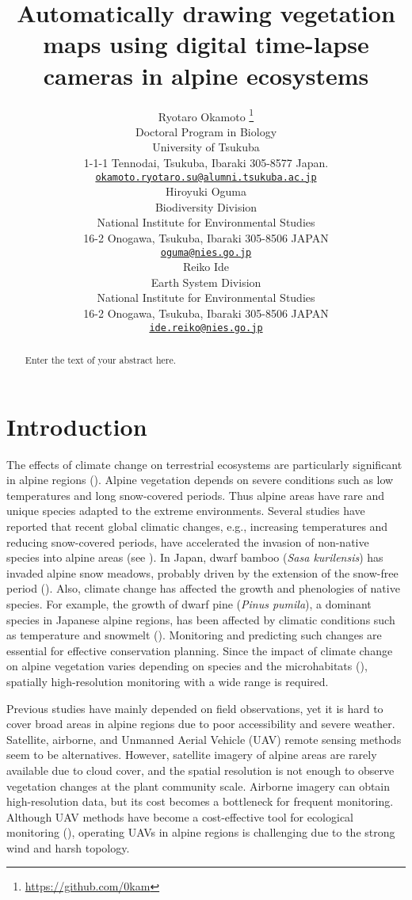 \documentclass{article}
\title{Automatically drawing vegetation maps using digital time-lapse
cameras in alpine ecosystems}
\author{
    Ryotaro Okamoto
    \thanks{\url{https://github.com/0kam}}
   \\
    Doctoral Program in Biology \\
    University of Tsukuba \\
  1-1-1 Tennodai, Tsukuba, Ibaraki 305-8577 Japan. \\
  \texttt{\href{mailto:okamoto.ryotaro.su@alumni.tsukuba.ac.jp}{\nolinkurl{okamoto.ryotaro.su@alumni.tsukuba.ac.jp}}} \\
   \And
    Hiroyuki Oguma
   \\
    Biodiversity Division \\
    National Institute for Environmental Studies \\
  16-2 Onogawa, Tsukuba, Ibaraki 305-8506 JAPAN \\
  \texttt{\href{mailto:oguma@nies.go.jp}{\nolinkurl{oguma@nies.go.jp}}} \\
   \And
    Reiko Ide
   \\
    Earth System Division \\
    National Institute for Environmental Studies \\
  16-2 Onogawa, Tsukuba, Ibaraki 305-8506 JAPAN \\
  \texttt{\href{mailto:ide.reiko@nies.go.jp}{\nolinkurl{ide.reiko@nies.go.jp}}} \\
  }
\begin{document}
\maketitle


\begin{abstract}
Enter the text of your abstract here.
\end{abstract}


\hypertarget{introduction}{%
\section{Introduction}\label{introduction}}

The effects of climate change on terrestrial ecosystems are particularly
significant in alpine regions (\cite{IPCC2007}). Alpine vegetation
depends on severe conditions such as low temperatures and long
snow-covered periods. Thus alpine areas have rare and unique species
adapted to the extreme environments. Several studies have reported that
recent global climatic changes, e.g., increasing temperatures and
reducing snow-covered periods, have accelerated the invasion of
non-native species into alpine areas (see
\cite{Alexander2016AlpBotany}). In Japan, dwarf bamboo (\emph{Sasa
kurilensis}) has invaded alpine snow meadows, probably driven by the
extension of the snow-free period (\cite{Kudo2011EcoEvo}). Also, climate
change has affected the growth and phenologies of native species. For
example, the growth of dwarf pine (\emph{Pinus pumila}), a dominant
species in Japanese alpine regions, has been affected by climatic
conditions such as temperature and snowmelt (\cite{Amagai2015EcoRes}).
Monitoring and predicting such changes are essential for effective
conservation planning. Since the impact of climate change on alpine
vegetation varies depending on species and the microhabitats
(\cite{Kudo2010AAA}), spatially high-resolution monitoring with a wide
range is required.

Previous studies have mainly depended on field observations, yet it is
hard to cover broad areas in alpine regions due to poor accessibility
and severe weather. Satellite, airborne, and Unmanned Aerial Vehicle
(UAV) remote sensing methods seem to be alternatives. However, satellite
imagery of alpine areas are rarely available due to cloud cover, and the
spatial resolution is not enough to observe vegetation changes at the
plant community scale. Airborne imagery can obtain high-resolution data,
but its cost becomes a bottleneck for frequent monitoring. Although UAV
methods have become a cost-effective tool for ecological monitoring
(\cite{Baena2017PLOSONE}), operating UAVs in alpine regions is
challenging due to the strong wind and harsh topology.
\end{document}
